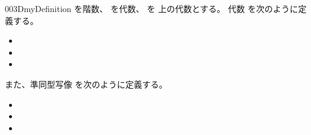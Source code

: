 \documentclass[index]{subfiles}
\begin{document}
\begin{myBlock}{003D}{myDefinition}
  を階数、
  を\myInlineMath{\myNat}代数、
  を
  上の\myInlineMath{\myNat}代数とする。
  \myInlineMath{\myNat}代数
  を次のように定義する。
  \begin{itemize}
  \item {}
  \item {}
  \item {}
  \end{itemize}
  また、\myInlineMath{\myNat}準同型写像
  を次のように定義する。
  \begin{itemize}
  \item {}
  \item \myInlineMath{\myNatHomZero \myDefEq \myRefl{\myBlank}}
  \item {}
  \end{itemize}
\end{myBlock}
\end{document}

